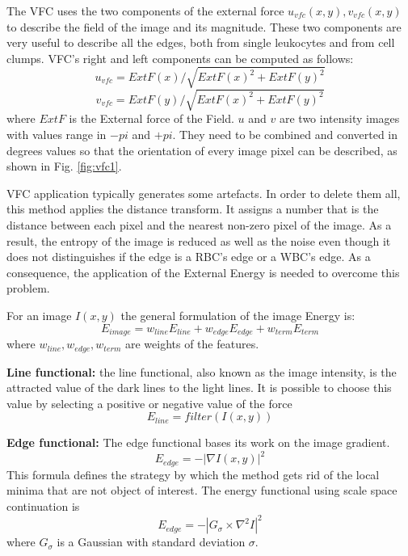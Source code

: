 \documentclass[final,a4paper,12pt,english]{UnicaPhdThesis3}
\begin{document}
The VFC uses the two components of the external force ${u} _{vfc} ( x,y ) , {v} _{vfc} (x,y)$ to describe the field of the image and its magnitude. These two components are very useful to describe all the edges, both from single leukocytes and from cell clumps. VFC's right and left components can be computed as follows:
\begin{equation}
{u} _{vfc}=ExtF(x)/\sqrt{ExtF(x)^{2} + ExtF(y)^{2}}
\end{equation}
\begin{equation}
{v} _{vfc}=ExtF(y)/\sqrt{ExtF(x)^{2} + ExtF(y)^{2}}
\end{equation}
where $ExtF$ is the External force of the Field. $u$ and $v$ are two intensity images with values range in $-pi$ and $+pi$. They need to be combined and converted in degrees values so that the orientation of every image pixel can be described, as shown in Fig. \ref{fig:vfc1}. 

VFC application typically generates some artefacts. In order to delete them all, this method applies the distance transform. It assigns a number that is the distance between each pixel and the nearest non-zero pixel of the image. As a result, the entropy of the image is reduced as well as the noise even though it does not distinguishes if the edge is a RBC's edge or a WBC's edge. As a consequence, the application of the External Energy is needed to overcome this problem.

For an image $I(x,y)$ the general formulation of the image Energy is:
\begin{equation}
E_{image}=w_{line}E_{line} + w_{edge}E_{edge} + w_{term}E_{term}
\end{equation}
where $w_{line}, w_{edge}, w_{term}$ are weights of the features.

\textbf{Line functional:} the line functional, also known as the image intensity, is the attracted value of the dark lines to the light lines. It is possible to choose this value by selecting a positive or negative value of the force
\begin{equation}
E_{{line}}=filter(I(x,y))
\end{equation}

\textbf{Edge functional:} The edge functional bases its work on the image gradient.
\begin{equation}
E_{{edge}}=-\left|\nabla I(x,y)\right\vert ^{2}
\end{equation}
This formula defines the strategy by which the method gets rid of the local minima that are not object of interest. The energy functional using scale space continuation is
\begin{equation}
E_{edge}=-\left|G_{\sigma }\times\nabla ^{2}I\right\vert ^{2}
\end{equation}
where $ G_{\sigma } $ is a Gaussian with standard deviation $ \sigma $.
\end{document}
